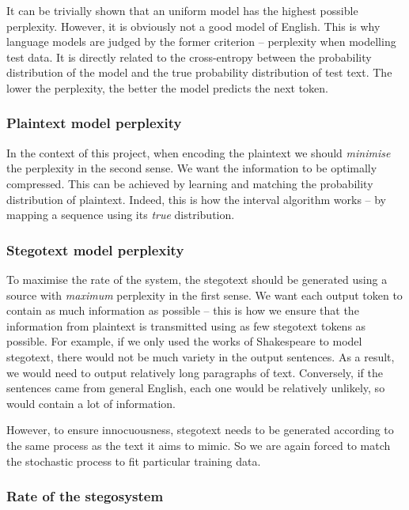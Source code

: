 \documentclass[draft]{IIBproject}
\makeatletter
\DeclareRobustCommand*{\AbbreviationWithDot}[1]{\@ifnextchar{.}{#1}{#1.\@\xspace}}
\DeclareRobustCommand*{\iid}{\AbbreviationWithDot{i.i.d}}
\makeatother
\begin{document}
It can be trivially shown that an \iid uniform model has the highest possible perplexity. However, it is obviously not a good model of English. This is why language models are judged by the former criterion -- perplexity when modelling test data. It is directly related to the cross-entropy between the probability distribution of the model and the true probability distribution of test text. The lower the perplexity, the better the model predicts the next token.

\subsubsection{Plaintext model perplexity}

In the context of this project, when encoding the plaintext we should \emph{minimise} the perplexity in the second sense. We want the information to be optimally compressed. This can be achieved by learning and matching the probability distribution of plaintext. Indeed, this is how the interval algorithm works -- by mapping a sequence using its \emph{true} distribution.

\subsubsection{Stegotext model perplexity}

To maximise the rate of the system, the stegotext should be generated using a source with \emph{maximum} perplexity in the first sense. We want each output token to contain as much information as possible -- this is how we ensure that the information from plaintext is transmitted using as few stegotext tokens as possible. For example, if we only used the works of Shakespeare to model stegotext, there would not be much variety in the output sentences. As a result, we would need to output relatively long paragraphs of text. Conversely, if the sentences came from general English, each one would be relatively unlikely, so would contain a lot of information.

However, to ensure innocuousness, stegotext needs to be generated according to the same process as the text it aims to mimic. So we are again forced to match the stochastic process to fit particular training data.

\subsubsection{Rate of the stegosystem}
\end{document}
